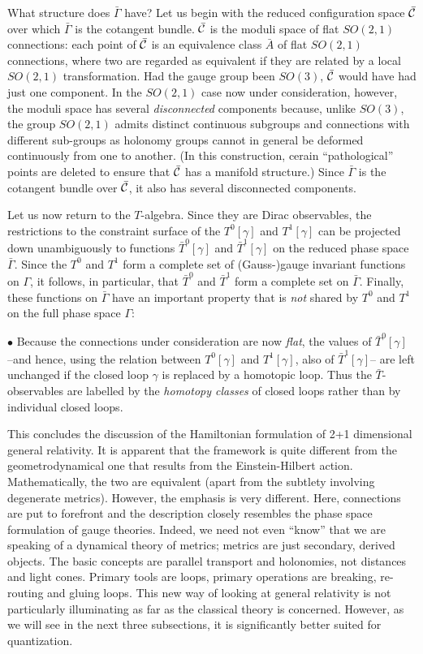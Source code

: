 What structure does $\bar\Gamma$ have? Let us begin with the reduced
configuration space $\bar{\cal C}$ over which $\bar\Gamma$ is the cotangent
bundle. $\bar{\cal C}$ is the moduli space of flat $SO(2,1)$ connections:
each point of $\bar{\cal C}$ is an equivalence class $\bar A$ of flat
$SO(2,1)$ connections, where two are regarded as equivalent if they are
related by a local $SO(2,1)$ transformation. Had the gauge group been
$SO(3)$, $\bar{\cal C}$ would have had just one component. In the $SO(2,1)$
case now under consideration, however, the moduli space has several
{\it disconnected} components because, unlike $SO(3)$, the group $SO(2,1)$
admits distinct continuous subgroups and connections with different
sub-groups as holonomy groups cannot in general be deformed continuously
from one to another. (In this construction, cerain ``pathological'' points
are deleted to ensure that $\bar{\cal C}$ has a manifold structure.) Since
$\bar{\Gamma}$ is the cotangent bundle over $\bar{\cal C}$, it also has
several disconnected components.

Let us now return to the $T$-algebra. Since they are Dirac observables, the
restrictions to the constraint surface of the $T^0[\gamma ]$ and $T^1[\gamma ]$
can be projected down unambiguously to functions $\bar{T}^0[\gamma ]$ and
$\bar{T}^1[\gamma ]$ on the reduced phase space $\bar\Gamma$. Since the
$T^0$ and $T^1$ form a complete set of (Gauss-)gauge invariant functions on
$\Gamma$, it follows, in particular, that $\bar{T}^0$ and $\bar{T}^1$ form
a complete set on $\bar{\Gamma}$. Finally, these functions on $\bar\Gamma$
have an important property that is {\it not} shared by $T^0$ and $T^1$ on
the full phase space $\Gamma$:
\item{$\bullet$} {Because the connections under consideration are now {\it
flat}, the values of $\bar{T}^0[\gamma ]$ --and hence, using the
relation between $T^0[\gamma]$ and $T^1[\gamma]$, also of $\bar{T}^1
[\gamma ]$-- are left unchanged if the closed loop $\gamma$ is replaced by a
homotopic loop. Thus the $\bar{T}$-observables are labelled by the {\it
homotopy classes} of closed loops rather than by individual closed loops.}
\medskip

This concludes the discussion of the Hamiltonian formulation of 2+1
dimensional general relativity. It is apparent that the framework is
quite different from the geometrodynamical one that results from the
Einstein-Hilbert action. Mathematically, the two are equivalent (apart
from the subtlety involving degenerate metrics). However, the emphasis is
very different. Here, connections are put to forefront and the description
closely resembles the phase space formulation of gauge theories. Indeed,
we need not even ``know'' that we are speaking of a dynamical theory
of metrics; metrics are just secondary, derived objects. The basic
concepts are parallel transport and holonomies, not distances and
light cones. Primary tools are loops, primary operations are breaking,
re-routing and gluing loops. This new way of looking at general relativity
is not particularly illuminating as far as the classical theory is concerned.
However, as we will see in the next three subsections, it is significantly
better suited for quantization.

